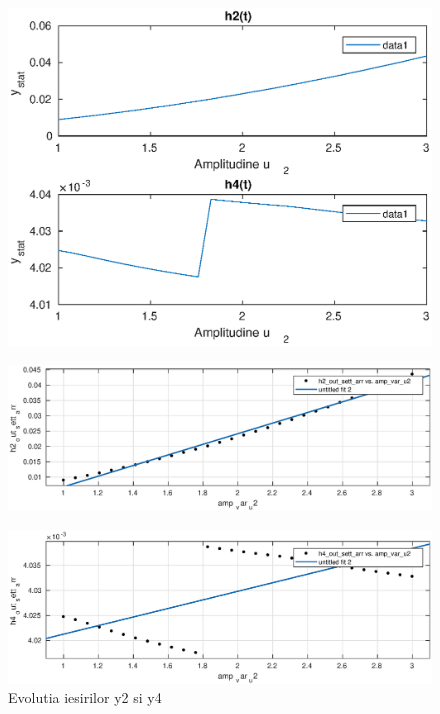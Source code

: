 \documentclass[12pt,english]{article}
\begin{document}
\begin{center}
	\begin{figure} [htbp]
		\includegraphics[width=1\textwidth]{c_1.eps}
	\end{figure}
\end{center}

\begin{center}
	\begin{figure} [htbp]
		\includegraphics[width=1\textwidth]{c_2_1.eps}
	\end{figure}
\end{center}

\begin{center}
	\begin{figure} [htbp]
		\includegraphics[width=1\textwidth]{c_2_2.eps}
		\caption{Evolutia iesirilor y2 si y4}
	\end{figure}
\end{center}
\end{document}
